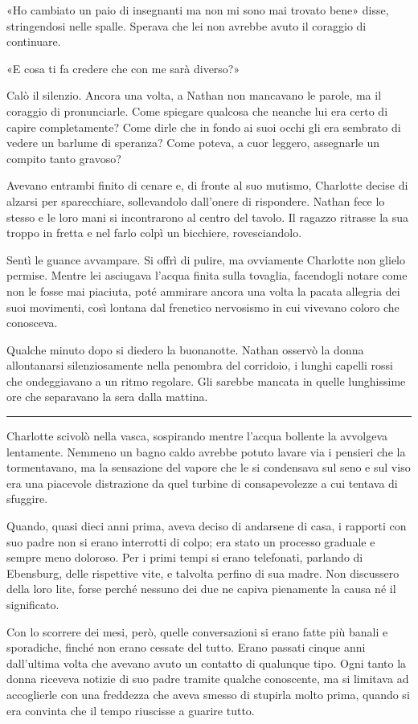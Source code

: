 \documentclass[a4paper,oneside,11pt]{memoir}
\begin{document}
«Ho cambiato un paio di insegnanti ma non mi sono mai trovato bene» disse,
stringendosi nelle spalle. Sperava che lei non avrebbe avuto il coraggio di
continuare.

«E cosa ti fa credere che con me sarà diverso?»

Calò il silenzio. Ancora una volta, a Nathan non mancavano le parole, ma il
coraggio di pronunciarle. Come spiegare qualcosa che neanche lui era certo di
capire completamente? Come dirle che in fondo ai suoi occhi gli era sembrato di
vedere un barlume di speranza? Come poteva, a cuor leggero, assegnarle un
compito tanto gravoso?

Avevano entrambi finito di cenare e, di fronte al suo mutismo, Charlotte decise
di alzarsi per sparecchiare, sollevandolo dall'onere di rispondere. Nathan fece
lo stesso e le loro mani si incontrarono al centro del tavolo. Il ragazzo
ritrasse la sua troppo in fretta e nel farlo colpì un bicchiere, rovesciandolo.

Sentì le guance avvampare. Si offrì di pulire, ma ovviamente Charlotte non
glielo permise. Mentre lei asciugava l'acqua finita sulla tovaglia, facendogli
notare come non le fosse mai piaciuta, poté ammirare ancora una volta la pacata
allegria dei suoi movimenti, così lontana dal frenetico nervosismo in cui
vivevano coloro che conosceva.

Qualche minuto dopo si diedero la buonanotte. Nathan osservò la donna
allontanarsi silenziosamente nella penombra del corridoio, i lunghi capelli
rossi che ondeggiavano a un ritmo regolare. Gli sarebbe mancata in quelle
lunghissime ore che separavano la sera dalla mattina.

\plainbreak{1}

Charlotte scivolò nella vasca, sospirando mentre l'acqua bollente la avvolgeva
lentamente. Nemmeno un bagno caldo avrebbe potuto lavare via i pensieri che la
tormentavano, ma la sensazione del vapore che le si condensava sul seno e sul
viso era una piacevole distrazione da quel turbine di consapevolezze a cui
tentava di sfuggire.

Quando, quasi dieci anni prima, aveva deciso di andarsene di casa, i rapporti
con suo padre non si erano interrotti di colpo; era stato un processo graduale e
sempre meno doloroso. Per i primi tempi si erano telefonati, parlando di
Ebensburg, delle rispettive vite, e talvolta perfino di sua madre. Non
discussero della loro lite, forse perché nessuno dei due ne capiva pienamente la
causa né il significato.

Con lo scorrere dei mesi, però, quelle conversazioni si erano fatte più banali e
sporadiche, finché non erano cessate del tutto. Erano passati cinque anni
dall'ultima volta che avevano avuto un contatto di qualunque tipo. Ogni tanto la
donna riceveva notizie di suo padre tramite qualche conoscente, ma si limitava
ad accoglierle con una freddezza che aveva smesso di stupirla molto prima,
quando si era convinta che il tempo riuscisse a guarire tutto.
\end{document}
